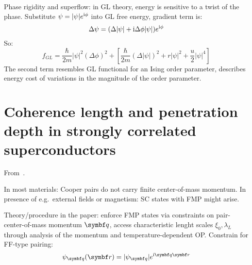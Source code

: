 \documentclass[../main.tex]{subfiles}
\begin{document}
Phase rigidity and superflow: in GL theory, energy is sensitive to a twist of the phase.
Substitute \(\psi = \vert \psi \vert e^{\mathrm{i} \phi}\) into GL free energy, gradient term is:
\begin{equation}
	\Delta \psi = (\Delta \vert \psi \vert + \mathrm{i} \Delta \phi \vert \psi \vert) e^{\mathrm{i} \phi}
\end{equation}
So:
\begin{equation}
	f_{GL}  = \frac{\hbar}{2m} \vert \psi \vert^2 (\Delta \phi)^2 + \left[ \frac{\hbar}{2m} (\Delta \vert \psi \vert)^2 + r \vert \psi \vert^2 + \frac{u}{2} \vert \psi \vert^4 \right]
\end{equation}
The second term resembles GL functional for an Ising order parameter, describes energy cost of variations in the magnitude of the order parameter.



\section{Coherence length and penetration depth in strongly correlated superconductors}

From~\cite{wittBypassingLatticeBCSBEC2024}.

In most materials: Cooper pairs do not carry finite center-of-mass momentum.
In presence of e.g.\ external fields or magnetism: SC states with FMP might arise.

Theory/procedure in the paper: enforce FMP states via constraints on pair-center-of-mass momentum \(\vb{q}\), access characteristic lenght scales \(\xi_0, \lambda_L\) through analysis of the momentum and temperature-dependent OP\@.
Constrain for FF-type pairing:
\begin{equation}
	\psi_{\vb{q}} (\vb{r}) = \vert \psi_{\vb{q}} \vert e^{\iu \vb{q} \vb{r}}
\end{equation}
\end{document}
